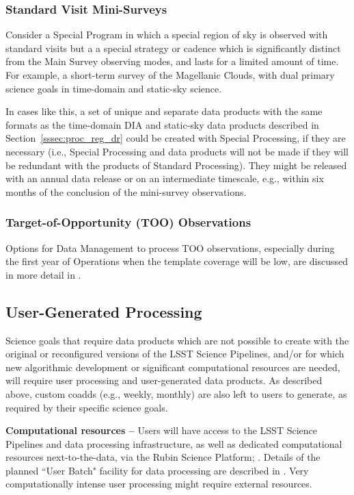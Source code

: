 \subsubsection{Standard Visit Mini-Surveys}

Consider a Special Program in which a special region of sky is observed with standard
visits but a a special strategy or cadence which is significantly distinct from the Main Survey
observing modes, and lasts for a limited amount of time.
For example, a short-term survey of the Magellanic Clouds, with dual primary science
goals in time-domain and static-sky science.

In cases like this, a set of unique and separate data products with the same formats as the 
time-domain DIA and static-sky data products described in Section~\ref{sssec:proc_reg_dr}
could be created with Special Processing, if they are necessary 
(i.e., Special Processing and data products will not be made if they will be redundant
with the products of Standard Processing).
They might be released with an annual data release or on an intermediate timescale, e.g.,
within six months of the conclusion of the mini-survey observations.

\subsubsection{Target-of-Opportunity (TOO) Observations}

Options for Data Management to process TOO observations, especially during the first year of Operations 
when the template coverage will be low, are discussed in more detail in 
.

\subsection{User-Generated Processing}\label{ssec:proc_user}

Science goals that require data products which are not possible to create with 
the original or reconfigured versions of the LSST Science Pipelines, 
and/or for which new algorithmic development or significant computational resources 
are needed, will require user processing and user-generated data products.
As described above, custom coadds (e.g., weekly, monthly) are also left to users 
to generate, as required by their specific science goals.

\textbf{Computational resources -- }
Users will have access to the LSST Science Pipelines and data processing 
infrastructure, as well as dedicated computational resources next-to-the-data, 
via the Rubin Science Platform; .
Details of the planned ``User Batch" facility for data processing are described in 
.
Very computationally intense user processing might require external resources. 

